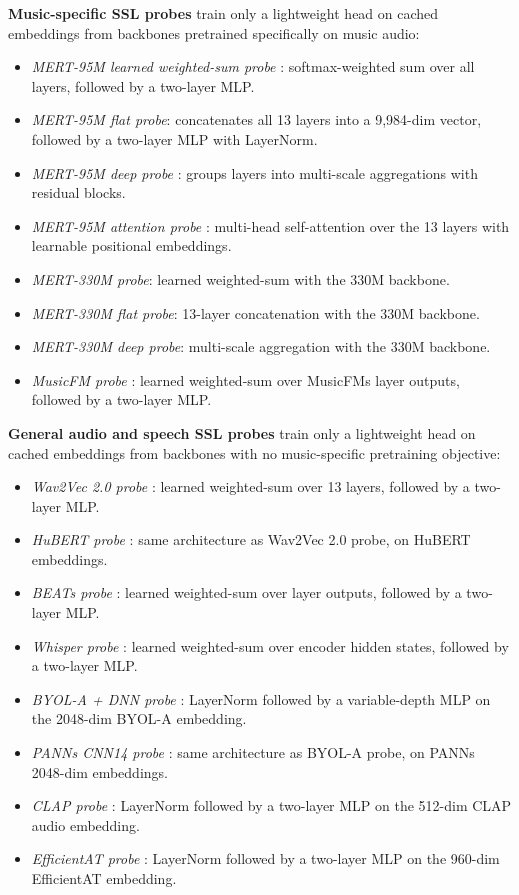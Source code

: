 \documentclass[conference]{IEEEtran}
\providecommand{\tightlist}{\setlength{\itemsep}{0pt}\setlength{\parskip}{0pt}}
\begin{document}
\textbf{Music-specific SSL probes} train only a lightweight head on
cached embeddings from backbones pretrained specifically on music audio:

\begin{itemize}
\tightlist
\item
  \emph{MERT-95M learned weighted-sum probe} \citep{pasad2021layer}:
  softmax-weighted sum over all layers, followed by a two-layer MLP.
\item
  \emph{MERT-95M flat probe}: concatenates all 13 layers into a
  9,984-dim vector, followed by a two-layer MLP with LayerNorm.
\item
  \emph{MERT-95M deep probe} \citep{yang2021superb}: groups layers into
  multi-scale aggregations with residual blocks.
\item
  \emph{MERT-95M attention probe} \citep{safari2020self}: multi-head
  self-attention over the 13 layers with learnable positional
  embeddings.
\item
  \emph{MERT-330M probe}: learned weighted-sum with the 330M backbone.
\item
  \emph{MERT-330M flat probe}: 13-layer concatenation with the 330M
  backbone.
\item
  \emph{MERT-330M deep probe}: multi-scale aggregation with the 330M
  backbone.
\item
  \emph{MusicFM probe} \citep{li2024musicfm}: learned weighted-sum over
  MusicFM\textquotesingle s layer outputs, followed by a two-layer MLP.
\end{itemize}

\textbf{General audio and speech SSL probes} train only a lightweight
head on cached embeddings from backbones with no music-specific
pretraining objective:

\begin{itemize}
\tightlist
\item
  \emph{Wav2Vec 2.0 probe} \citep{baevski2020wav2vec}: learned
  weighted-sum over 13 layers, followed by a two-layer MLP.
\item
  \emph{HuBERT probe} \citep{hsu2021hubert}: same architecture as
  Wav2Vec 2.0 probe, on HuBERT embeddings.
\item
  \emph{BEATs probe} \citep{chen2023beats}: learned weighted-sum over
  layer outputs, followed by a two-layer MLP.
\item
  \emph{Whisper probe} \citep{radford2023whisper}: learned weighted-sum
  over encoder hidden states, followed by a two-layer MLP.
\item
  \emph{BYOL-A + DNN probe} \citep{niizumi2023byola}: LayerNorm followed
  by a variable-depth MLP on the 2048-dim BYOL-A embedding.
\item
  \emph{PANNs CNN14 probe} \citep{kong2020panns}: same architecture as
  BYOL-A probe, on PANNs 2048-dim embeddings.
\item
  \emph{CLAP probe} \citep{wu2023clap}: LayerNorm followed by a
  two-layer MLP on the 512-dim CLAP audio embedding.
\item
  \emph{EfficientAT probe} \citep{schmid2023efficientat}: LayerNorm
  followed by a two-layer MLP on the 960-dim EfficientAT embedding.
\end{itemize}
\end{document}
